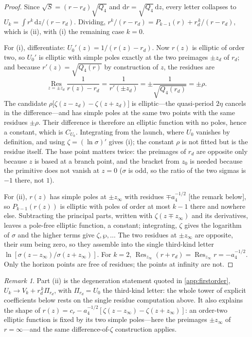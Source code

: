 \documentclass[12pt]{iopart}
\newcommand{\dd}{\mathrm{d}}
\theoremstyle{plain}
\theoremstyle{definition}
\theoremstyle{plain}
\theoremstyle{remark}
\newtheorem*{remark}{Remark}
\begin{document}
\begin{proof}
Since $\sqrt S=(r-r_d)\sqrt{Q_4}$ and $\dd r=\sqrt{Q_4}\,\dd z$, every letter collapses to
$U_k=\int r^k\,\dd z/(r-r_d)$. Dividing, $r^k/(r-r_d)=P_{k-1}(r)+r_d^{\,k}/(r-r_d)$, which
is (ii), with (i) the remaining case $k=0$.

For (i), differentiate: $U_0'(z)=1/(r(z)-r_d)$. Now $r(z)$ is elliptic of order two, so
$U_0'$ is elliptic with simple poles exactly at the two preimages $\pm z_d$ of $r_d$; and
because $r'(z)=\sqrt{Q_4(r)}$ by construction of $z$, the residues are
\[
   \operatorname*{Res}_{z=\pm z_d}\frac{1}{r(z)-r_d}=\frac{1}{r'(\pm z_d)}
   =\pm\frac{1}{\sqrt{Q_4(r_d)}}=\pm\rho .
\]
The candidate $\rho\big[\zeta(z-z_d)-\zeta(z+z_d)\big]$ is elliptic---the quasi-period
$2\eta$ cancels in the difference---and has simple poles at the same two points with the
same residues $\pm\rho$. Their difference is therefore an elliptic function with no poles,
hence a constant, which is $C_{U_0}$. Integrating from the launch, where $U_0$ vanishes by
definition, and using $\zeta=(\ln\sigma)'$ gives (i); the constant $\rho$ is not fitted but
is the residue itself. The base point matters twice: the preimages of $r_d$ are opposite
only because $z$ is based at a branch point, and the bracket from $z_0$ is needed because
the primitive does not vanish at $z=0$ ($\sigma$ is odd, so the ratio of the two sigmas is
$-1$ there, not $1$).

For (ii), $r(z)$ has simple poles at $\pm z_\infty$ with residues $\mp a_4^{-1/2}$ [the
remark below], so $P_{k-1}(r(z))$ is elliptic with poles of order at most $k-1$ there and
nowhere else. Subtracting the principal parts, written with $\zeta(z\mp z_\infty)$ and its
derivatives, leaves a pole-free elliptic function, a constant; integrating,
$\zeta$ gives the logarithm of $\sigma$ and the higher terms give $\zeta,\wp,\dots$ The two
residues at $\pm z_\infty$ are opposite, their sum being zero, so they assemble into the
single third-kind letter $\ln[\sigma(z-z_\infty)/\sigma(z+z_\infty)]$. For $k=2$,
$\operatorname{Res}_{z_\infty}(r+r_d)=\operatorname{Res}_{z_\infty}r=-a_4^{-1/2}$. Only the
horizon points are free of residues; the points at infinity are not.
\end{proof}

\begin{remark}
Part (ii) is the degeneration statement quoted in \ref{app:firstorder}, $U_k\to V_k+
r_d^{\,k}\Pi_{r_d}$, with $\Pi_{r_d}=U_0$ the third-kind letter: the whole tower of
explicit coefficients below rests on the single residue computation above. It also
explains the shape of $r(z)=c_r-a_4^{-1/2}[\zeta(z-z_\infty)-\zeta(z+z_\infty)]$: an
order-two elliptic function is fixed by its two simple poles---here the preimages
$\pm z_\infty$ of $r=\infty$---and the same difference-of-$\zeta$ construction applies.
\end{remark}
\end{document}
